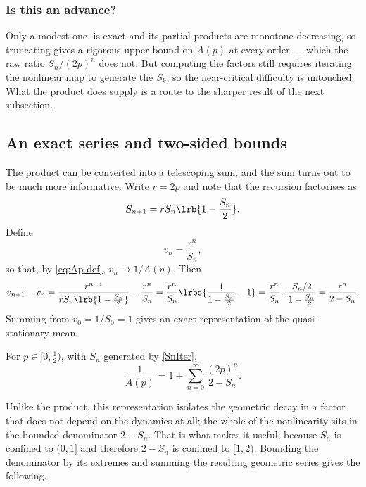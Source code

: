 \subsubsection*{Is this an advance?}

Only a modest one.  is exact and its partial products are monotone
decreasing, so truncating gives a rigorous upper bound on $A(p)$ at every order --- which
the raw ratio $S_n/(2p)^n$ does not. But computing the factors still requires iterating
the nonlinear map to generate the $S_k$, so the near-critical difficulty is untouched.
What the product does supply is a route to the sharper result of the next subsection.

\subsection{An exact series and two-sided bounds}
\label{sec:Abounds}

The product can be converted into a telescoping sum, and the sum turns out to be much
more informative. Write $r=2p$ and note that the recursion factorises as
\begin{equation*}
S_{n+1} = rS_n\lrb{1-\frac{S_n}{2}} .
\end{equation*}
Define
\begin{equation*}
v_n = \frac{r^n}{S_n},
\end{equation*}
so that, by \cref{eq:Ap-def}, $v_n\to1/A(p)$. Then
\begin{equation*}
v_{n+1}-v_n
= \frac{r^{n+1}}{rS_n\lrb{1-\frac{S_n}{2}}} - \frac{r^n}{S_n}
= \frac{r^n}{S_n}\lrbs{\frac{1}{1-\frac{S_n}{2}}-1}
= \frac{r^n}{S_n}\cdot\frac{S_n/2}{1-\frac{S_n}{2}}
= \frac{r^n}{2-S_n}.
\end{equation*}
Summing from $v_0 = 1/S_0 = 1$ gives an exact representation of the quasi-stationary
mean.

\begin{proposition}
\label{prop:series}
For $p\in[0,\tfrac12)$, with $S_n$ generated by \cref{SnIter},
\begin{equation}
\label{eq:Aseries}
\frac{1}{A(p)} = 1 + \sum_{n=0}^{\infty}\frac{(2p)^n}{2-S_n}.
\end{equation}
\end{proposition}

\noindent
Unlike the product, this representation isolates the geometric decay in a factor that
does not depend on the dynamics at all; the whole of the nonlinearity sits in the
bounded denominator $2-S_n$. That is what makes it useful, because $S_n$ is confined to
$(0,1]$ and therefore $2-S_n$ is confined to $[1,2)$. Bounding the denominator by its
extremes and summing the resulting geometric series gives the following.

